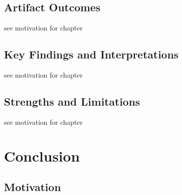 \documentclass[
	bibliography=totoc,
	listof=totoc,
]{scrbook}
\begin{document}
\section{Artifact Outcomes} %


\begin{marker}\begin{justify}
see motivation for chapter
\end{justify}\end{marker}


\section{Key Findings and Interpretations} %


\begin{marker}\begin{justify}
see motivation for chapter
\end{justify}\end{marker}


\section{Strengths and Limitations} %


\begin{marker}\begin{justify}
see motivation for chapter
\end{justify}\end{marker}


\pagebreak %
\chapter{Conclusion} %
\section*{Motivation} %
\end{document}
